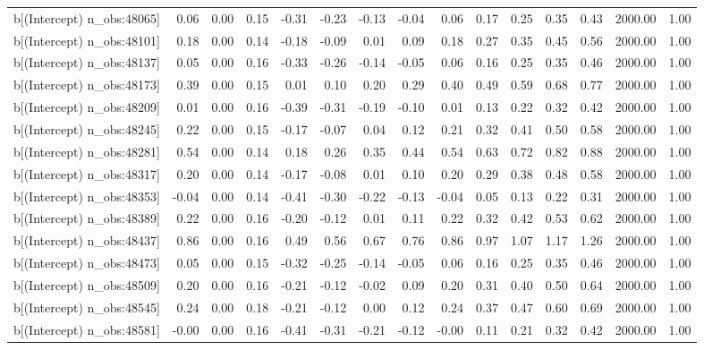 \begin{table}[ht]
\begin{tabular}{rrrrrrrrrrrrrrr}
  b[(Intercept) n\_obs:48065] & 0.06 & 0.00 & 0.15 & -0.31 & -0.23 & -0.13 & -0.04 & 0.06 & 0.17 & 0.25 & 0.35 & 0.43 & 2000.00 & 1.00 \\ 
  b[(Intercept) n\_obs:48101] & 0.18 & 0.00 & 0.14 & -0.18 & -0.09 & 0.01 & 0.09 & 0.18 & 0.27 & 0.35 & 0.45 & 0.56 & 2000.00 & 1.00 \\ 
  b[(Intercept) n\_obs:48137] & 0.05 & 0.00 & 0.16 & -0.33 & -0.26 & -0.14 & -0.05 & 0.06 & 0.16 & 0.25 & 0.35 & 0.46 & 2000.00 & 1.00 \\ 
  b[(Intercept) n\_obs:48173] & 0.39 & 0.00 & 0.15 & 0.01 & 0.10 & 0.20 & 0.29 & 0.40 & 0.49 & 0.59 & 0.68 & 0.77 & 2000.00 & 1.00 \\ 
  b[(Intercept) n\_obs:48209] & 0.01 & 0.00 & 0.16 & -0.39 & -0.31 & -0.19 & -0.10 & 0.01 & 0.13 & 0.22 & 0.32 & 0.42 & 2000.00 & 1.00 \\ 
  b[(Intercept) n\_obs:48245] & 0.22 & 0.00 & 0.15 & -0.17 & -0.07 & 0.04 & 0.12 & 0.21 & 0.32 & 0.41 & 0.50 & 0.58 & 2000.00 & 1.00 \\ 
  b[(Intercept) n\_obs:48281] & 0.54 & 0.00 & 0.14 & 0.18 & 0.26 & 0.35 & 0.44 & 0.54 & 0.63 & 0.72 & 0.82 & 0.88 & 2000.00 & 1.00 \\ 
  b[(Intercept) n\_obs:48317] & 0.20 & 0.00 & 0.14 & -0.17 & -0.08 & 0.01 & 0.10 & 0.20 & 0.29 & 0.38 & 0.48 & 0.58 & 2000.00 & 1.00 \\ 
  b[(Intercept) n\_obs:48353] & -0.04 & 0.00 & 0.14 & -0.41 & -0.30 & -0.22 & -0.13 & -0.04 & 0.05 & 0.13 & 0.22 & 0.31 & 2000.00 & 1.00 \\ 
  b[(Intercept) n\_obs:48389] & 0.22 & 0.00 & 0.16 & -0.20 & -0.12 & 0.01 & 0.11 & 0.22 & 0.32 & 0.42 & 0.53 & 0.62 & 2000.00 & 1.00 \\ 
  b[(Intercept) n\_obs:48437] & 0.86 & 0.00 & 0.16 & 0.49 & 0.56 & 0.67 & 0.76 & 0.86 & 0.97 & 1.07 & 1.17 & 1.26 & 2000.00 & 1.00 \\ 
  b[(Intercept) n\_obs:48473] & 0.05 & 0.00 & 0.15 & -0.32 & -0.25 & -0.14 & -0.05 & 0.06 & 0.16 & 0.25 & 0.35 & 0.46 & 2000.00 & 1.00 \\ 
  b[(Intercept) n\_obs:48509] & 0.20 & 0.00 & 0.16 & -0.21 & -0.12 & -0.02 & 0.09 & 0.20 & 0.31 & 0.40 & 0.50 & 0.64 & 2000.00 & 1.00 \\ 
  b[(Intercept) n\_obs:48545] & 0.24 & 0.00 & 0.18 & -0.21 & -0.12 & 0.00 & 0.12 & 0.24 & 0.37 & 0.47 & 0.60 & 0.69 & 2000.00 & 1.00 \\ 
  b[(Intercept) n\_obs:48581] & -0.00 & 0.00 & 0.16 & -0.41 & -0.31 & -0.21 & -0.12 & -0.00 & 0.11 & 0.21 & 0.32 & 0.42 & 2000.00 & 1.00 \\ 

\end{tabular}
\end{table}
